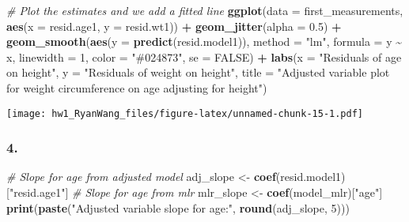 \documentclass[
]{article}
\newenvironment{Shaded}{\begin{snugshade}}{\end{snugshade}}
\newcommand{\AttributeTok}[1]{\textcolor[rgb]{0.13,0.29,0.53}{#1}}
\newcommand{\CommentTok}[1]{\textcolor[rgb]{0.56,0.35,0.01}{\textit{#1}}}
\newcommand{\ConstantTok}[1]{\textcolor[rgb]{0.56,0.35,0.01}{#1}}
\newcommand{\DecValTok}[1]{\textcolor[rgb]{0.00,0.00,0.81}{#1}}
\newcommand{\FloatTok}[1]{\textcolor[rgb]{0.00,0.00,0.81}{#1}}
\newcommand{\FunctionTok}[1]{\textcolor[rgb]{0.13,0.29,0.53}{\textbf{#1}}}
\newcommand{\NormalTok}[1]{#1}
\newcommand{\OtherTok}[1]{\textcolor[rgb]{0.56,0.35,0.01}{#1}}
\newcommand{\SpecialCharTok}[1]{\textcolor[rgb]{0.81,0.36,0.00}{\textbf{#1}}}
\newcommand{\StringTok}[1]{\textcolor[rgb]{0.31,0.60,0.02}{#1}}
\begin{document}
\begin{Shaded}
\begin{Highlighting}[]
\CommentTok{\# Plot the estimates and we add a fitted line}
\FunctionTok{ggplot}\NormalTok{(}\AttributeTok{data =}\NormalTok{ first\_measurements,}
                  \FunctionTok{aes}\NormalTok{(}\AttributeTok{x =}\NormalTok{ resid.age1, }\AttributeTok{y =}\NormalTok{ resid.wt1)) }\SpecialCharTok{+}
  \FunctionTok{geom\_jitter}\NormalTok{(}\AttributeTok{alpha =} \FloatTok{0.5}\NormalTok{) }\SpecialCharTok{+}
  \FunctionTok{geom\_smooth}\NormalTok{(}\FunctionTok{aes}\NormalTok{(}\AttributeTok{y =} \FunctionTok{predict}\NormalTok{(resid.model1)), }\AttributeTok{method =} \StringTok{"lm"}\NormalTok{, }\AttributeTok{formula =}\NormalTok{ y }\SpecialCharTok{\textasciitilde{}}\NormalTok{ x,}
              \AttributeTok{linewidth =} \DecValTok{1}\NormalTok{, }\AttributeTok{color =} \StringTok{"\#024873"}\NormalTok{, }\AttributeTok{se =} \ConstantTok{FALSE}\NormalTok{) }\SpecialCharTok{+}
  \FunctionTok{labs}\NormalTok{(}\AttributeTok{x =} \StringTok{"Residuals of age on height"}\NormalTok{,}
       \AttributeTok{y =} \StringTok{"Residuals of weight on height"}\NormalTok{,}
       \AttributeTok{title =} \StringTok{"Adjusted variable plot for weight circumference on age adjusting for height"}\NormalTok{) }
\end{Highlighting}
\end{Shaded}

\texttt{[image: hw1\_RyanWang\_files/figure-latex/unnamed-chunk-15-1.pdf]}

\subsubsection{4.}\label{section-15}

\begin{Shaded}
\begin{Highlighting}[]
\CommentTok{\# Slope for age from adjusted model}
\NormalTok{adj\_slope }\OtherTok{\textless{}{-}} \FunctionTok{coef}\NormalTok{(resid.model1)[}\StringTok{"resid.age1"}\NormalTok{]}
\CommentTok{\# Slope for age from mlr}
\NormalTok{mlr\_slope }\OtherTok{\textless{}{-}} \FunctionTok{coef}\NormalTok{(model\_mlr)[}\StringTok{"age"}\NormalTok{]}
\FunctionTok{print}\NormalTok{(}\FunctionTok{paste}\NormalTok{(}\StringTok{"Adjusted variable slope for age:"}\NormalTok{, }\FunctionTok{round}\NormalTok{(adj\_slope, }\DecValTok{5}\NormalTok{)))}
\end{Highlighting}
\end{Shaded}
\end{document}
